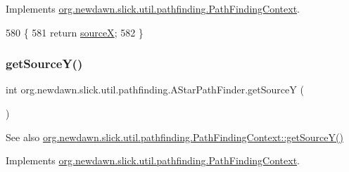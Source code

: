 Implements \mbox{\hyperlink{interfaceorg_1_1newdawn_1_1slick_1_1util_1_1pathfinding_1_1_path_finding_context_a7b67cdc7d0eaf54e6e07d09b1a575065}{org.\+newdawn.\+slick.\+util.\+pathfinding.\+Path\+Finding\+Context}}.


\begin{DoxyCode}
580                             \{
581         \textcolor{keywordflow}{return} \mbox{\hyperlink{classorg_1_1newdawn_1_1slick_1_1util_1_1pathfinding_1_1_a_star_path_finder_aa57984b3f637153ce573e88bb635e87b}{sourceX}};
582     \}
\end{DoxyCode}
\mbox{\label{classorg_1_1newdawn_1_1slick_1_1util_1_1pathfinding_1_1_a_star_path_finder_abfd761f71fe0c43a7d3533e49cf5be33}} 
\subsubsection{\texorpdfstring{get\+Source\+Y()}{getSourceY()}}
{\footnotesize\ttfamily int org.\+newdawn.\+slick.\+util.\+pathfinding.\+A\+Star\+Path\+Finder.\+get\+SourceY (\begin{DoxyParamCaption}{ }\end{DoxyParamCaption})\hspace{0.3cm}{\ttfamily [inline]}}

\begin{DoxySeeAlso}{See also}
\mbox{\hyperlink{interfaceorg_1_1newdawn_1_1slick_1_1util_1_1pathfinding_1_1_path_finding_context_a30ac68532d0f3e9e5f4ce5e5e88f593e}{org.\+newdawn.\+slick.\+util.\+pathfinding.\+Path\+Finding\+Context\+::get\+Source\+Y()}} 
\end{DoxySeeAlso}


Implements \mbox{\hyperlink{interfaceorg_1_1newdawn_1_1slick_1_1util_1_1pathfinding_1_1_path_finding_context_a30ac68532d0f3e9e5f4ce5e5e88f593e}{org.\+newdawn.\+slick.\+util.\+pathfinding.\+Path\+Finding\+Context}}.


